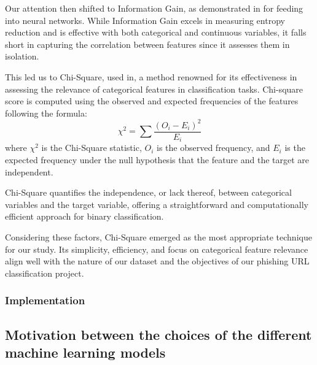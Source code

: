 \documentclass{article}
\begin{document}
    Our attention then shifted to Information Gain, as demonstrated in\cite{EfficientDeepLearningPhishingDetection} for feeding into neural networks.
    While Information Gain excels in measuring entropy reduction and is effective with both categorical and continuous variables, it falls short in capturing the correlation between features since it assesses them in isolation.

    This led us to Chi-Square, used in\cite{LexicalFeatureSelection}, a method renowned for its effectiveness in assessing the relevance of categorical features in classification tasks.
    Chi-square score is computed using the observed and expected frequencies of the features following the formula:
    \begin{equation}
        \chi^2 = \sum \frac{(O_i - E_i)^2}{E_i}\label{eq:equation}
    \end{equation}
    where \( \chi^2 \) is the Chi-Square statistic, \( O_i \) is the observed frequency, and \( E_i \) is the expected frequency under the null hypothesis that the feature and the target are independent.

    Chi-Square quantifies the independence, or lack thereof, between categorical variables and the target variable, offering a straightforward and computationally efficient approach for binary classification.

    Considering these factors, Chi-Square emerged as the most appropriate technique for our study.
    Its simplicity, efficiency, and focus on categorical feature relevance align well with the nature of our dataset and the objectives of our phishing URL classification project.



    \subsubsection{Implementation}\label{subsubsec:implementation}


    \subsection{Motivation between the choices of the different machine learning models}\label{subsec:motivation-between-the-choices-of-the-different-machine-learning-models2}
\end{document}
